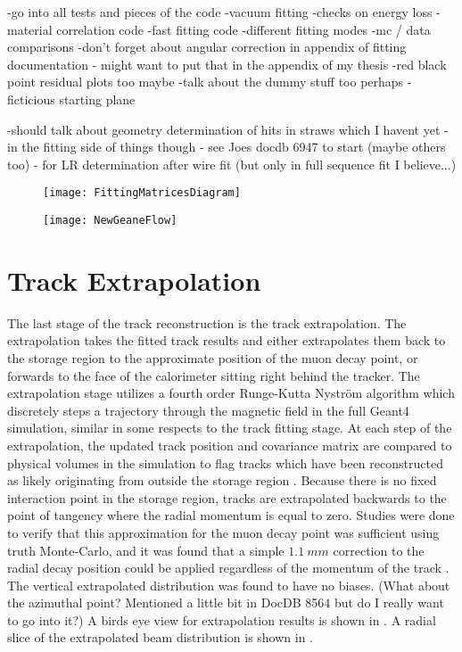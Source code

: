 -go into all tests and pieces of the code
-vacuum fitting
-checks on energy loss
-material correlation code
-fast fitting code
-different fitting modes
-mc / data comparisons
-don't forget about angular correction in appendix of fitting documentation - might want to put that in the appendix of my thesis
-red black point residual plots too maybe
-talk about the dummy stuff too perhaps
-ficticious starting plane


-should talk about geometry determination of hits in straws which I havent yet - in the fitting side of things though - see Joes docdb 6947 to start (maybe others too) - for LR determination after wire fit (but only in full sequence fit I believe...)




\begin{figure}[]
  \centering
  \texttt{[image: FittingMatricesDiagram]}
    \caption[Fitting matrices diagram]{}
    \label{fig:FittingMatricesDiagram}
\end{figure}

\begin{figure}[]
  \centering
  \texttt{[image: NewGeaneFlow]}
    \caption[Geane code flow]{}
    \label{fig:NewGeaneFlow}
\end{figure}



\section{Track Extrapolation}
\label{sec:TrackExtrapolation}

The last stage of the track reconstruction is the track extrapolation. The extrapolation takes the fitted track results and either extrapolates them back to the storage region to the approximate position of the muon decay point, or forwards to the face of the calorimeter sitting right behind the tracker. The extrapolation stage utilizes a fourth order Runge-Kutta Nystr\"{o}m algorithm \cite{SCThesis} which discretely steps a trajectory through the magnetic field in the full \gmtwo Geant4 simulation, similar in some respects to the track fitting stage. At each step of the extrapolation, the updated track position and covariance matrix are compared to physical volumes in the simulation to flag tracks which have been reconstructed as likely originating from outside the storage region \cite{SCThesis,extrapolationerrors}. Because there is no fixed interaction point in the storage region, tracks are extrapolated backwards to the point of tangency where the radial momentum is equal to zero. Studies were done to verify that this approximation for the muon decay point was sufficient using truth Monte-Carlo, and it was found that a simple $\SI{1.1}{mm}$ correction to the radial decay position could be applied regardless of the momentum of the track \cite{SCThesis}. The vertical extrapolated distribution was found to have no biases. (What about the azimuthal point? Mentioned a little bit in DocDB 8564 but do I really want to go into it?) A birds eye view for extrapolation results is shown in . A radial slice of the extrapolated beam distribution is shown in .


